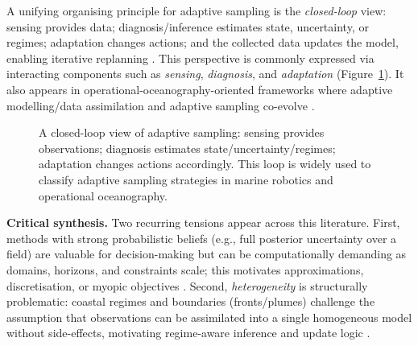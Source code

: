 A unifying organising principle for adaptive sampling is the \emph{closed-loop} view:
sensing provides data; diagnosis/inference estimates state, uncertainty, or regimes; adaptation changes actions; and the
collected data updates the model, enabling iterative replanning \parencite{hwang2019auvreview,bernacchi2025closingloop,lermusiaux2007adaptive}.
This perspective is commonly expressed via interacting components such as \emph{sensing}, \emph{diagnosis}, and \emph{adaptation}
(Figure~\ref{fig:pda_loop}). It also appears in operational-oceanography-oriented frameworks where adaptive modelling/data
assimilation and adaptive sampling co-evolve \parencite{lermusiaux2007adaptive,curtin2009aosn}.

\begin{figure}[t]
  \centering
  \caption{A closed-loop view of adaptive sampling: sensing provides observations; diagnosis estimates state/uncertainty/regimes;
  adaptation changes actions accordingly. This loop is widely used to classify adaptive sampling strategies in marine robotics and
  operational oceanography.}
  \label{fig:pda_loop}
\end{figure}

\noindent\textbf{Critical synthesis.}
Two recurring tensions appear across this literature. First, methods with strong probabilistic beliefs
(e.g., full posterior uncertainty over a field) are valuable for decision-making but can be computationally demanding as
domains, horizons, and constraints scale; this motivates approximations, discretisation, or myopic objectives
\parencite{hwang2019auvreview,lermusiaux2007adaptive}. Second, \emph{heterogeneity} is structurally problematic:
coastal regimes and boundaries (fronts/plumes) challenge the assumption that observations can be assimilated into a single
homogeneous model without side-effects, motivating regime-aware inference and update logic
\parencite{fossum2020compact,ge2023watermasses,bernacchi2025closingloop}.

